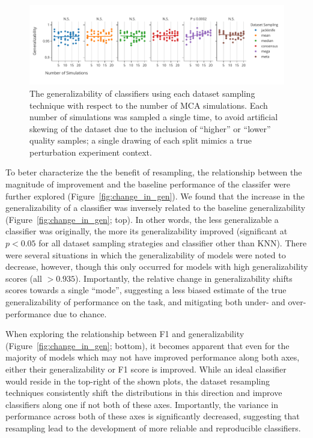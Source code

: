 \documentclass[10pt]{SelfArx} %
\begin{document}
\begin{figure}[ht]\centering
\includegraphics[width=\linewidth]{figures/3.pdf}
\caption{The generalizability of classifiers using each dataset sampling technique with respect to the number of MCA
simulations. Each number of simulations was sampled a single time, to avoid artificial skewing of the dataset due to
the inclusion of ``higher'' or ``lower'' quality samples; a single drawing of each split mimics a true perturbation
experiment context.}
\label{fig:nmca}
\end{figure}

To beter characterize the the benefit of resampling, the relationship between the magnitude of improvement and the
baseline performance of the classifer were further explored (Figure~\ref{fig:change_in_gen}). We found that the
increase in the generalizability of a classifier was inversely related to the baseline generalizability
(Figure~\ref{fig:change_in_gen}; top). In other words, the less generalizable a classifier was originally, the more its
generalizability improved (significant at $p < 0.05$ for all dataset sampling strategies and classifier other than
KNN). There were several situations in which the generalizability of models were noted to decrease, however, though
this only occurred for models with high generalizability scores (all $>0.935$). Importantly, the relative change in
generalizability shifts scores towards a single ``mode'', suggesting a less biased estimate of the true
generalizability of performance on the task, and mitigating both under- and over-performance due to chance.

When exploring the relationship between F1 and generalizability (Figure~\ref{fig:change_in_gen}; bottom), it becomes
apparent that even for the majority of models which may not have improved performance along both axes, either their
generalizability or F1 score is improved. While an ideal classifier would reside in the top-right of the shown plots,
the dataset resampling techniques consistently shift the distributions in this direction and improve classifiers along
one if not both of these axes. Importantly, the variance in performance across both of these axes is significantly
decreased, suggesting that resampling lead to the development of more reliable and reproducible classifiers.
\end{document}
